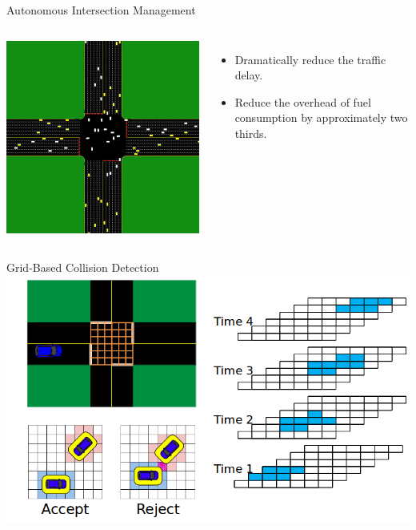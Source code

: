 \documentclass{beamer}
\begin{document}
\begin{frame}{Autonomous Intersection Management}
\begin{columns}[c]
		\includegraphics[width=\textwidth]{aim.png}
				
		\begin{itemize}
		\item Dramatically reduce the traffic delay.
		\item Reduce the overhead of fuel consumption by approximately
		two thirds. \cite{bib:Dresner08Multiagent}
		\end{itemize}
\end{columns}
\end{frame}

\begin{frame}{Grid-Based Collision Detection}
	\includegraphics[width=\textwidth]{grids.png}
\end{frame}
\end{document}
